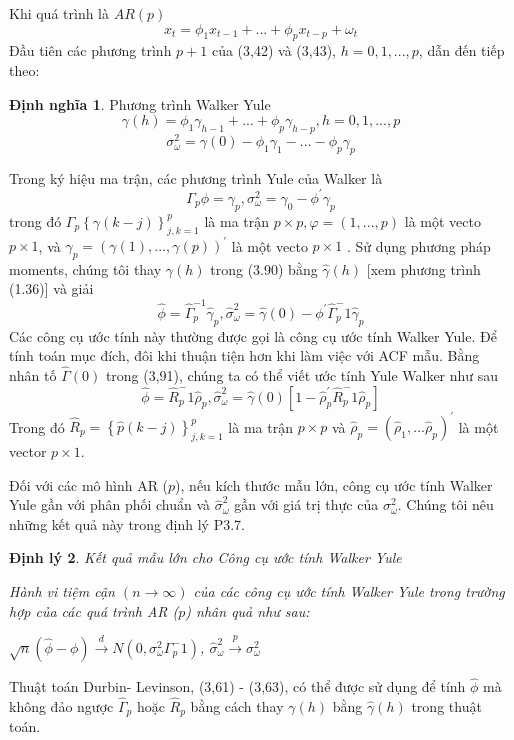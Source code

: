 \documentclass[12pt, a4paper,oneside]{book}
\newtheorem{theo}{\bf Định lý}[section]
\theoremstyle{definition}
\newtheorem{dn}[theo]{Định nghĩa}
\begin{document}
Khi quá trình là $ AR(p) $
$$x_{t}=\phi_{1}x_{t-1}+...+\phi_{p}x_{t-p}+\omega_{t} $$
Đầu tiên các phương trình $ p + 1 $ của (3,42) và (3,43), $ h = 0, 1 ,. . . , p $, dẫn đến
tiếp theo:
\begin{dn}
	Phương trình Walker Yule
	$$ \gamma(h)=\phi_{1}\gamma_{h-1}+...+\phi_{p}\gamma_{h-p} , h = 0, 1 ,. . . , p $$
	$$ \sigma_{\omega}^2=\gamma(0) - \phi_{1}\gamma_{1}-...-\phi_{p}\gamma_{p}  $$
	
\end{dn}
Trong ký hiệu ma trận, các phương trình Yule của Walker là
$$ \Gamma_{p}\phi=\gamma_{p}, \sigma_{\omega}^2=\gamma_{0}-\phi^{'}\gamma_{p} $$
trong đó $ \Gamma_{p}\left\lbrace \gamma(k-j)\right\rbrace_{j,k=1}^p  $ là ma trận $ p \times p, \varphi=(1,...,p) $ là một vecto $ p \times 1 $, và $ \gamma_{p}=(\gamma(1),...,\gamma(p))^{'} $ là một vecto $ p\times1 $ . Sử dụng phương pháp moments, chúng tôi thay $ \gamma(h) $ trong (3.90) bằng $ \hat{\gamma}(h) $  [xem phương trình (1.36)] và giải
$$ \hat{\phi}=\hat{\Gamma}_{p}^{-1}\hat{\gamma}_{p},  \hat{\sigma}_{\omega}^2=\hat{\gamma}(0)-\phi^{'}\hat{\Gamma}_{p}^-1\hat{\gamma}_{p} $$
Các công cụ ước tính này thường được gọi là công cụ ước tính Walker Yule. Để tính toán mục đích, đôi khi thuận tiện hơn khi làm việc với ACF mẫu.
Bằng nhân tố $ \hat{\Gamma}(0) $ trong (3,91), chúng ta có thể viết ước tính Yule Walker như sau
$$ \hat{\phi}=\hat{R}_{p}^-1\hat{\rho}_{p}, \hat{\sigma}_{\omega}^2=\hat{\gamma}(0)[1-\hat{\rho}_{p}^{\prime} \hat{R}_{p}^-1\hat{\rho}_{p}] $$
Trong đó $ \hat{R}_{p}=\left\lbrace\hat{p}(k-j)\right\rbrace _{j,k=1}^p  $ là ma trận $p\times p$ và $\hat{\rho}_{p}=(\hat{\rho}_{1},...\hat{\rho}_{p})^{\prime}  $ là một vector $ p\times 1 $.

Đối với các mô hình AR ($ p $), nếu kích thước mẫu lớn, công cụ ước tính Walker Yule gần với phân phối chuẩn và $ \hat{\sigma}_{\omega}^2 $ gần với giá trị thực của $ \sigma_{\omega}^2 $. Chúng tôi nêu những kết quả này trong định lý P3.7.
\begin{theo}
	Kết quả mẫu lớn cho Công cụ ước tính Walker Yule
	
	Hành vi tiệm cận $ (n \longrightarrow\infty) $ của các công cụ ước tính Walker Yule trong trường hợp của các quá trình AR ($ p $) nhân quả như sau:
	\begin{center}
		$\sqrt{n}(\hat{\phi}-\phi) \xrightarrow{d} N(0,\sigma_{\omega}^2\Gamma_{p}^-1)$,  $\hat{\sigma}_{\omega}^2 \xrightarrow{p} \sigma_{\omega}^2$
	\end{center}  
	
\end{theo}
Thuật toán  Durbin- Levinson, (3,61) - (3,63), có thể được sử dụng để tính $ \hat{\phi} $ mà không đảo ngược $ \hat{\Gamma}_{p} $ hoặc $ \hat{R}_{p} $ bằng cách thay $ \gamma(h) $ bằng $ \hat{\gamma}(h) $ trong thuật toán.  
\end{document}
